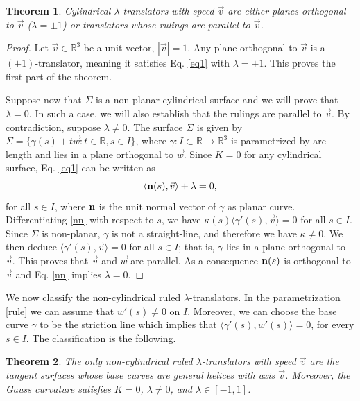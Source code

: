 \documentclass[12pt]{amsart}
\def\r{\mathbb R}
\newtheorem{theorem}{Theorem}[section]
\theoremstyle{definition}
\begin{document}
\begin{theorem} \label{pr-cyl}
Cylindrical $\lambda$-translators with speed $\vec{v}$ are either planes orthogonal to $\vec{v}$ ($\lambda =\pm 1$) or translators whose rulings are parallel to $\vec{v}$.
\end{theorem}

\begin{proof}
Let $\vec{v}\in \r^3$ be a unit vector, $|\vec{v}|=1$. Any plane orthogonal to $\vec{v}$ is a $(\pm 1)$-translator, meaning it satisfies Eq. \eqref{eq1} with $\lambda=\pm 1$. This proves the first part of the theorem.

Suppose now that $\Sigma$ is a non-planar cylindrical surface and we will prove that $\lambda=0$. In such a case, we will also establish that the rulings are parallel to $\vec{v}$. By contradiction, suppose $\lambda\not=0$. The surface $\Sigma$ is given by  $\Sigma=\{\gamma(s)+t\vec{w}:t\in \r,s\in I \}$, where $\gamma\colon I\subset\r\to\r^3$ is parametrized by arc-length and lies in a plane orthogonal to $\vec{w}$. Since $K=0$ for any cylindrical surface, Eq.  \eqref{eq1} can be written as
\begin{equation}\label{nn}
\langle {\bf n}(s),\vec{v}\rangle+\lambda=0,
\end{equation}
for all $s\in I$, where ${\bf n}$ is the unit normal vector of $\gamma$ as planar curve. Differentiating \eqref{nn} with respect to $s$, we have
$\kappa(s)\langle\gamma'(s),\vec{v}\rangle=0$ for all $s\in I$. Since $\Sigma$ is non-planar, $\gamma$ is not a straight-line, and therefore we have $\kappa\not=0$. We then deduce $\langle\gamma'(s),\vec{v}\rangle=0$ for all $s\in I$; that is, $\gamma$ lies in a plane orthogonal to $\vec{v}$. This proves that $\vec{v}$ and $\vec{w}$ are parallel. As a consequence ${\bf n}(s)$ is orthogonal to $\vec{v}$ and Eq. \eqref{nn} implies $\lambda=0$.

\end{proof}

We now classify the non-cylindrical ruled $\lambda$-translators. In the parametrization \eqref{rule} we can  assume that $w'(s) \neq 0$ on $I$. Moreover, we can choose the base curve  $\gamma$ to be the striction line which implies that   $\langle \gamma'(s),w'(s)\rangle=0$, for every $s\in I$. The classification is the following.  

\begin{theorem} \label{pr-rul}
The only non-cylindrical ruled $\lambda$-translators with speed $\vec{v}$ are the tangent surfaces whose base curves are general helices with axis $\vec{v}$. Moreover, the Gauss curvature satisfies $K=0$, $\lambda \neq 0$, and $\lambda \in [-1,1]$.
\end{theorem}
\end{document}
